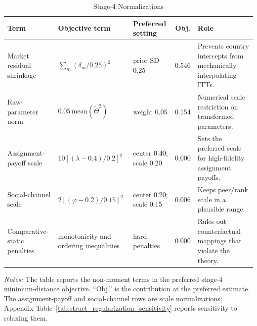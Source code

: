 \begin{table}[H]
\centering
\caption{Stage-4 Normalizations}
\label{tab:struct_stage4_normalizations}
\begin{threeparttable}
\scriptsize
\setlength{\tabcolsep}{3pt}
\begin{tabular}[t]{>{\raggedright\arraybackslash}p{2.5cm}>{\raggedright\arraybackslash}p{3.2cm}>{\raggedright\arraybackslash}p{2.8cm}c>{\raggedright\arraybackslash}p{4.7cm}}
\toprule
Term & Objective term & Preferred setting & Obj. & Role \\
\midrule
Market residual shrinkage & $\sum_m(\delta_m/0.25)^2$ & prior SD 0.25 & 0.546 & Prevents country intercepts from mechanically interpolating ITTs. \\
Raw-parameter norm & $0.05\,\mathrm{mean}(\tilde{\Theta}^2)$ & weight 0.05 & 0.154 & Numerical scale restriction on transformed parameters. \\
Assignment-payoff scale & $10[(\lambda-0.4)/0.2]^2$ & center 0.40; scale 0.20 & 0.000 & Sets the preferred scale for high-fidelity assignment payoffs. \\
Social-channel scale & $2[(\varphi-0.2)/0.15]^2$ & center 0.20; scale 0.15 & 0.006 & Keeps peer/rank scale in a plausible range. \\
Comparative-static penalties & monotonicity and ordering inequalities & hard penalties & 0.000 & Rules out counterfactual mappings that violate the theory. \\
\bottomrule
\end{tabular}
\begin{tablenotes}
\footnotesize
\item \textit{Notes:} The table reports the non-moment terms in the preferred stage-4 minimum-distance objective. ``Obj.'' is the contribution at the preferred estimate. The assignment-payoff and social-channel rows are scale normalizations; Appendix Table~\ref{tab:struct_regularization_sensitivity} reports sensitivity to relaxing them.
\end{tablenotes}
\end{threeparttable}
\end{table}
